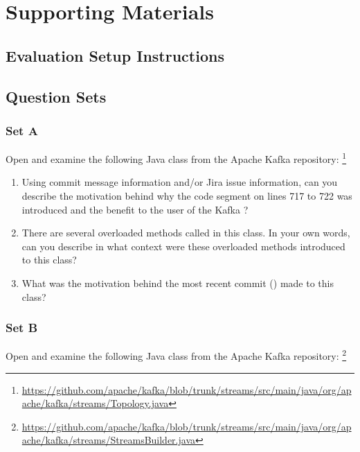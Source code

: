 \chapter{Supporting Materials}

\section{Evaluation Setup Instructions}
\label{sec:Setup-Instructions}


\section{Question Sets}

\subsection{Set A}
\label{subsec:Question-Set-A}

Open and examine the following Java class from the Apache Kafka repository:
\footnote{\url{https://github.com/apache/kafka/blob/trunk/streams/src/main/java/org/apache/kafka/streams/Topology.java}}

\begin{enumerate}
    \item Using commit message information and/or Jira issue information, can you describe the motivation behind why the code segment on lines 717 to 722 was introduced and the benefit to the user of the Kafka ?
    \item There are several overloaded methods called  in this class. In your own words, can you describe in what context were these overloaded methods introduced to this class?
    \item What was the motivation behind the most recent commit () made to this class?
\end{enumerate}

\subsection{Set B}
\label{subsec:Question-Set-B}

Open and examine the following Java class from the Apache Kafka repository:
\footnote{\url{https://github.com/apache/kafka/blob/trunk/streams/src/main/java/org/apache/kafka/streams/StreamsBuilder.java}}

